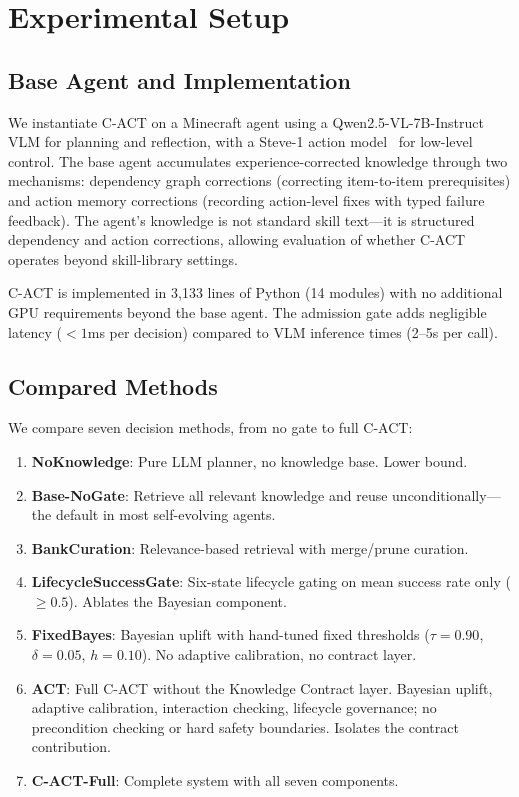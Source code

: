 \documentclass[letterpaper]{article}
\begin{document}
\section{Experimental Setup}

\subsection{Base Agent and Implementation}

We instantiate \textsc{C-ACT} on a Minecraft agent using a Qwen2.5-VL-7B-Instruct VLM for planning and reflection, with a Steve-1 action model~\cite{lifshitz2023} for low-level control. The base agent accumulates experience-corrected knowledge through two mechanisms: dependency graph corrections (correcting item-to-item prerequisites) and action memory corrections (recording action-level fixes with typed failure feedback). The agent's knowledge is not standard skill text---it is structured dependency and action corrections, allowing evaluation of whether \textsc{C-ACT} operates beyond skill-library settings.

\textsc{C-ACT} is implemented in 3,133 lines of Python (14 modules) with no additional GPU requirements beyond the base agent. The admission gate adds negligible latency ($<1$ms per decision) compared to VLM inference times (2--5s per call).

\subsection{Compared Methods}

We compare seven decision methods, from no gate to full \textsc{C-ACT}:

\begin{enumerate}
    \item \textbf{NoKnowledge}: Pure LLM planner, no knowledge base. Lower bound.
    \item \textbf{Base-NoGate}: Retrieve all relevant knowledge and reuse unconditionally---the default in most self-evolving agents.
    \item \textbf{BankCuration}: Relevance-based retrieval with merge/prune curation.
    \item \textbf{LifecycleSuccessGate}: Six-state lifecycle gating on mean success rate only ($\ge 0.5$). Ablates the Bayesian component.
    \item \textbf{FixedBayes}: Bayesian uplift with hand-tuned fixed thresholds ($\tau{=}0.90$, $\delta{=}0.05$, $h{=}0.10$). No adaptive calibration, no contract layer.
    \item \textbf{ACT}: Full \textsc{C-ACT} without the Knowledge Contract layer. Bayesian uplift, adaptive calibration, interaction checking, lifecycle governance; no precondition checking or hard safety boundaries. Isolates the contract contribution.
    \item \textbf{\textsc{C-ACT}-Full}: Complete system with all seven components.
\end{enumerate}
\end{document}
